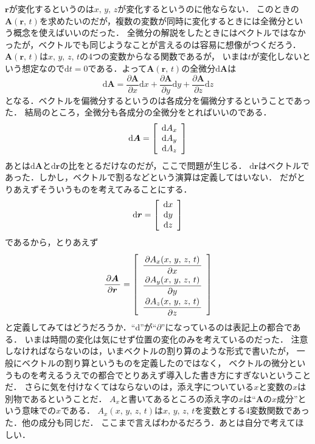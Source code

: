 $\bm{r}$が変化するというのは$x, \, y, \, z$が変化するというのに他ならない．
このときの$\bm{A}(\bm{r}, \, t)$を求めたいのだが，複数の変数が同時に変化するときには全微分という概念を使えばいいのだった．
全微分の解説をしたときにはベクトルではなかったが，ベクトルでも同じようなことが言えるのは容易に想像がつくだろう．
$\bm{A}(\bm{r}, \, t)$は$x, \, y, \, z, \, t$の4つの変数からなる関数であるが，
いまは$t$が変化しないという想定なので$\mathrm{d}t = 0$である．よって$\bm{A}(\bm{r}, \, t)$の全微分$\mathrm{d}\bm{A}$は
$$
\mathrm{d}\bm{A} =
\frac{\partial \bm{A}}{\partial x} \mathrm{d}x + \frac{\partial \bm{A}}{\partial y} \mathrm{d}y + 
\frac{\partial \bm{A}}{\partial z} \mathrm{d}z
$$
となる．ベクトルを偏微分するというのは各成分を偏微分するということであった．
結局のところ，全微分も各成分の全微分をとればいいのである．
$$
\mathrm{d}\bm{A} = \left[
\renewcommand{\arraystretch}{1}
\begin{array}{c}
 \mathrm{d} A_x \\
 \mathrm{d} A_y \\
 \mathrm{d} A_z
 \end{array}
 \right]
$$
あとは$\mathrm{d}\bm{A}$と$\mathrm{d}\bm{r}$の比をとるだけなのだが，ここで問題が生じる．
$\mathrm{d}\bm{r}$はベクトルであった．しかし，ベクトルで割るなどという演算は定義してはいない．
だがとりあえずそういうものを考えてみることにする．
$$
\mathrm{d}\bm{r} = \left[
\renewcommand{\arraystretch}{1}
\begin{array}{c}
 \mathrm{d} x \\
 \mathrm{d} y \\
 \mathrm{d} z
 \end{array}
 \right]
$$
であるから，とりあえず
\begin{eqnarray}
\frac{\partial \bm{A}}{\partial \bm{r}} = \left[
\renewcommand{\arraystretch}{2}
\begin{array}{c}
\displaystyle
\frac{\partial A_x (x, \, y, \, z, \, t)}{\partial x} \\
\displaystyle
\frac{\partial A_y (x, \, y, \, z, \, t)}{\partial y} \\
\displaystyle
\frac{\partial A_z (x, \, y, \, z, \, t)}{\partial z}
\end{array}
\right]
\label{eq:vecvecbibun}
\end{eqnarray}
と定義してみてはどうだろうか．``$\mathrm{d}$''が``$\partial$''になっているのは表記上の都合である．
いまは時間の変化は気にせず位置の変化のみを考えているのだった．
注意しなければならないのは，いまベクトルの割り算のような形式で書いたが，
一般にベクトルの割り算というものを定義したのではなく，
ベクトルの微分というものを考えるうえでの都合でとりあえず導入した書き方にすぎないということだ．
さらに気を付けなくてはならないのは，添え字についている$x$と変数の$x$は別物であるということだ．
$A_x$と書いてあるところの添え字の$x$は``$\bm{A}$の$x$成分''という意味での$x$である．
$A_x (x, \, y, \, z, \, t)$は$x, \, y, \, z, \, t$を変数とする4変数関数であった．他の成分も同じだ．
ここまで言えばわかるだろう．あとは自分で考えてほしい．

